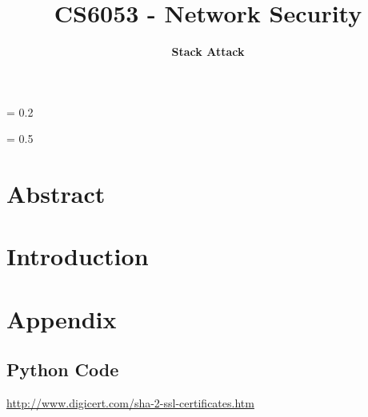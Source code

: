 \documentclass[10pt]{article}
\title{
    \vspace{2in}
    \textmd{\textbf{CS6053 - Network Security}}\\
    \vspace{4in}
}
\author{\textbf{Stack Attack}}
\begin{document}
\maketitle
\newpage
\parskip = 0.2\baselineskip
\newpage
\tableofcontents
\listoffigures
\listoftables
\parskip = 0.5\baselineskip
\newpage

\section{Abstract}

\section{Introduction}


\newpage
\section{Appendix}
    \subsection{Python Code}
    \newpage
    \newpage
    
    
    
    
    
    
    
    
    
    

\newpage
\begin{thebibliography}{9}
     \url{http://www.digicert.com/sha-2-ssl-certificates.htm}
\end{thebibliography}
\end{document}

